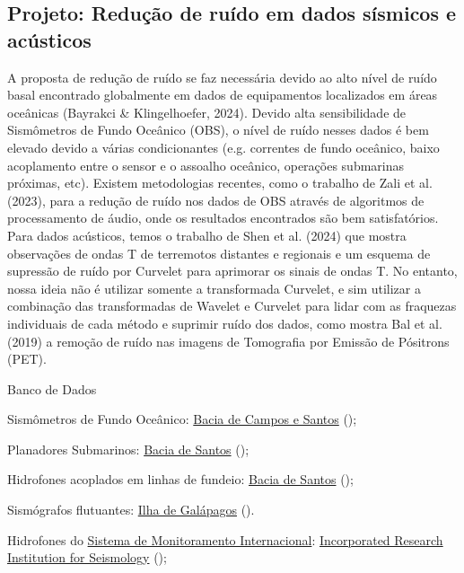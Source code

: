 \documentclass[10pt,a4paper,oneside]{book}
\begin{document}
\subsection{Projeto: Redução de ruído em dados sísmicos e acústicos}

A proposta de redução de ruído se faz necessária devido ao alto nível de ruído basal encontrado globalmente em dados de equipamentos localizados em áreas oceânicas (Bayrakci \& Klingelhoefer, 2024). Devido alta sensibilidade de Sismômetros de Fundo Oceânico (OBS), o nível de ruído nesses dados é bem elevado devido a várias condicionantes (e.g. correntes de fundo oceânico, baixo acoplamento entre o sensor e o assoalho oceânico, operações submarinas próximas, etc). Existem metodologias recentes, como o trabalho de Zali et al. (2023), para a redução de ruído nos dados de OBS através de algoritmos de processamento de áudio, onde os resultados encontrados são bem satisfatórios. Para dados acústicos, temos o trabalho de Shen et al. (2024) que mostra observações de ondas T de terremotos distantes e regionais e um esquema de supressão de ruído por Curvelet para aprimorar os sinais de ondas T. No entanto, nossa ideia não é utilizar somente a transformada Curvelet, e sim utilizar a combinação das transformadas de Wavelet e Curvelet para lidar com as fraquezas individuais de cada método e suprimir ruído dos dados, como mostra Bal et al.(2019) a remoção de ruído nas imagens de Tomografia por Emissão de Pósitrons (PET).

\begin{fancyenum}{\faDatabase}{Banco de Dados}
	\item Sismômetros de Fundo Oceânico: \href{https://sismo-oceano.ufsc.br/}{Bacia de Campos e Santos} (\faLock);
	\item Planadores Submarinos: \href{https://comunicabaciadesantos.petrobras.com.br/projeto-de-monitoramento-da-paisagem-acustica-submarina-pmpas-}{Bacia de Santos} (\faLock);
	\item Hidrofones acoplados em linhas de fundeio: \href{https://comunicabaciadesantos.petrobras.com.br/projeto-de-monitoramento-da-paisagem-acustica-submarina-pmpas-}{Bacia de Santos} (\faLock);
	\item Sismógrafos flutuantes: \href{https://www.geoazur.fr/GLOBALSEIS/Data.html}{Ilha de Galápagos} (\faUnlock).
	\item Hidrofones do \href{https://www.ctbto.org/our-work/international-monitoring-system}{Sistema de Monitoramento Internacional}: \href{https://ds.iris.edu/gmap/\#network=IM\&planet=earth}{Incorporated Research Institution for Seismology} (\faUnlock);

\end{fancyenum}
\end{document}
